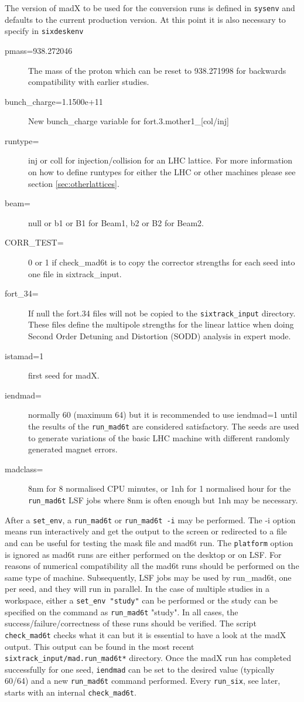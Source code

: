 \documentclass{article}    %
\begin{document}
The version of madX to be used for the conversion runs is defined
in {\tt sysenv} and defaults to the current production version.
At this point it is also necessary to specify in {\tt sixdeskenv}
\begin{description}
\item [pmass=938.272046] The mass of the proton \cite{NIST} which can be reset to
938.271998 for backwards compatibility with earlier studies.
\item [bunch\_charge=1.1500e+11] New bunch\_charge variable for fort.3.mother1\_[col/inj]
\item [runtype=] inj or coll for injection/collision for an LHC lattice.
For more information on how to define runtypes
for either the LHC or other machines please see section \ref{sec:otherlattices}.
\item [beam=] null or b1 or B1 for Beam1, b2 or B2 for Beam2.
\item [CORR\_TEST=]0 or 1 if check\_mad6t is to copy the corrector strengths
for each seed into one file in sixtrack\_input.
\item [fort\_34=] If null the fort.34 files will not be copied 
to the {\tt sixtrack\_input} directory. These files define the multipole strengths for the
linear lattice when doing Second Order Detuning and Distortion (SODD)
 analysis in expert mode.
\item [istamad=1] first seed for madX.
\item [iendmad=] normally 60 (maximum 64) but it is recommended to use 
iendmad=1 until the results of the {\tt run\_mad6t} are considered satisfactory.
The seeds are used to generate variations of the basic LHC machine with different
randomly generated magnet errors.
\item[madclass=] 8nm for 8 normalised CPU minutes, or 1nh for 1 normalised hour
for the {\tt run\_mad6t} LSF jobs where 8nm is often enough but 1nh may be
necessary.
\end{description}
After a {\tt set\_env}, a {\tt run\_mad6t} or {\tt run\_mad6t -i} may be performed.
The -i option means run interactively and get the output to the screen or
redirected to a file and can be useful for testing the mask file and mad6t run.
The {\tt platform} option is ignored as mad6t runs are either performed on 
the desktop or on LSF. For reasons of numerical compatibility all the {mad6t}  
runs should be performed on the same type of machine.
Subsequently, LSF jobs may be used by {run\_mad6t}, one per seed, and they will
run in parallel. 
In the case of multiple studies in a workspace, either a {\tt set\_env "study"} 
can be performed or the study can be specified on the command as 
{\tt run\_mad6t} "study".
In all cases, the success/failure/correctness of these runs should
be verified. The script {\tt check\_mad6t} checks what it can but it is
essential to have a look at the madX output. This output can be found in the
most recent {\tt sixtrack\_input/mad.run\_mad6t*} directory.
Once the madX run has completed successfully for one seed, {\tt iendmad}
can be set to the desired value (typically 60/64) and a new {\tt run\_mad6t} command
performed. Every {\tt run\_six}, see later, starts with an internal {\tt check\_mad6t}.
\end{document}
